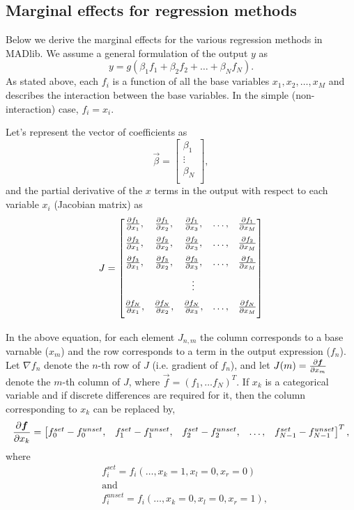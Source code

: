 \subsection{Marginal effects for regression methods} %
\label{sub:marginal_effects_for_regression_methods}

Below we derive the marginal effects for the various regression methods in MADlib.
We assume a general formulation of the output $y$ as
$$
    y = g(\beta_1 f_1 + \beta_2 f_2 + \ldots  + \beta_{N} f_{N}).
$$
As stated above, each $f_i$ is a function of all the base variables $x_1, x_2, \ldots, x_M$ and
describes the interaction between the base variables. In the simple
(non-interaction) case, $f_i = x_i$.

Let's represent the vector of coefficients as
$$
    \vec{\beta} =
        \begin{bmatrix}
            \beta_1 \\
            \vdots \\
            \beta_N \\
        \end{bmatrix},
$$
and the partial derivative of the $x$ terms in the output
with respect to each variable $x_i$ (Jacobian matrix) as
$$J =
    \begin{bmatrix}
        \pder[f_1]{x_1}, & \pder[f_1]{x_2}, & \pder[f_1]{x_3}, & \ldots, & \pder[f_1]{x_M}\\[7pt]
        \pder[f_2]{x_1}, & \pder[f_2]{x_2}, & \pder[f_2]{x_3}, & \ldots, & \pder[f_2]{x_M}\\[7pt]
        \pder[f_3]{x_1}, & \pder[f_3]{x_2}, & \pder[f_3]{x_3}, & \ldots, & \pder[f_3]{x_M}\\[7pt]
                           &                    & \vdots    &        & \\[7pt]
        \pder[f_N]{x_1}, & \pder[f_N]{x_2}, & \pder[f_N]{x_3}, & \ldots, & \pder[f_N]{x_M}\\[7pt]
    \end{bmatrix}
$$

In the above equation, for each element $J_{n,m}$ the column
corresponds to a base varnable ($x_m$) and the row corresponds to a term in
the output expression ($f_n$).
Let $\nabla f_n$ denote the $n$-th row of $J$ (i.e. gradient of $f_n$),
and let $J(m) = \pder[\vec{f}]{x_m}$ denote the $m$-th column of $J$, where $\vec{f} = (f_1, \ldots f_N)^T$.
If $x_k$ is a categorical variable and if discrete differences are required
for it, then the column corresponding to $x_k$ can be replaced by,
$$\pder[\vec{f}]{x_k} =
    \begin{bmatrix}
        f_0^{set} - f_0^{unset}, & f_1^{set} - f_1^{unset}, &
        f_2^{set} - f_2^{unset}, & \ldots, & f_{N - 1}^{set} - f_{N - 1}^{unset}
    \end{bmatrix}^T,
$$
where
\begin{align*}
    & f_i^{set} = f_i(\ldots, x_k=1, x_l=0, x_r=0) \\
    & \text{and} \\
    & f_i^{unset} = f_i(\ldots, x_k=0, x_l=0, x_r=1),
\end{align*}

